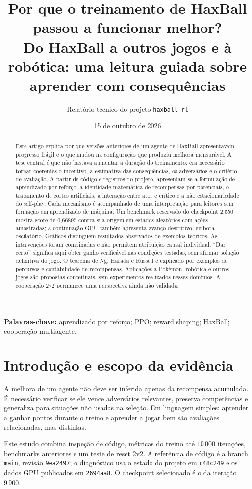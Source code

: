 \documentclass[11pt,a4paper]{article}
\title{\textbf{Por que o treinamento de HaxBall\\passou a funcionar melhor?}\\[5pt]
\large Do HaxBall a outros jogos e à robótica: uma leitura guiada sobre aprender com consequências}
\author{Relatório técnico do projeto \texttt{haxball-rl}}
\date{15 de outubro de 2026}
\newcommand{\code}[1]{\nolinkurl{#1}}
\begin{document}
\maketitle
\begin{abstract}
Este artigo explica por que versões anteriores de um agente de HaxBall apresentavam progresso frágil e o que mudou na configuração que produziu melhora mensurável. A tese central é que não bastava aumentar a duração do treinamento: era necessário tornar coerentes o incentivo, a estimativa das consequências, os adversários e o critério de avaliação. A partir de código e registros do projeto, apresentam-se a formulação de aprendizado por reforço, a identidade matemática de recompensas por potenciais, o tratamento de cortes artificiais, a interação entre ator e crítico e a não estacionariedade do self-play. Cada mecanismo é acompanhado de uma interpretação para leitores sem formação em aprendizado de máquina. Um benchmark reservado do checkpoint 2.550 mostra score de 0,66895 contra sua origem em estados aleatórios com ações amostradas; a continuação GPU também apresenta avanço descritivo, embora oscilatório. Gráficos distinguem resultados observados de exemplos teóricos. As intervenções foram combinadas e não permitem atribuição causal individual. ``Dar certo'' significa aqui obter ganho verificável nas condições testadas, sem afirmar solução definitiva do jogo. O teorema de Ng, Harada e Russell é explicado por exemplos de percursos e contabilidade de recompensas. Aplicações a Pokémon, robótica e outros jogos são propostas conceituais, sem experimentos realizados nesses domínios. A cooperação 2v2 permanece uma perspectiva ainda não validada.
\end{abstract}
\noindent\textbf{Palavras-chave:} aprendizado por reforço; PPO; reward shaping; HaxBall; cooperação multiagente.

\section{Introdução e escopo da evidência}
A melhora de um agente não deve ser inferida apenas da recompensa acumulada. É necessário verificar se ele vence adversários relevantes, preserva competências e generaliza para situações não usadas na seleção. Em linguagem simples: aprender a ganhar pontos durante o treino e aprender a jogar bem são avaliações relacionadas, mas distintas.

Este estudo combina inspeção de código, métricas do treino até $10\,000$ iterações, benchmarks anteriores e um teste de reset 2v2. A referência de código é a branch \code{main}, revisão \code{9ea2497}; o diagnóstico usa o estado do projeto em \code{c48c249} e os dados GPU publicados em \code{2694aa8}. O checkpoint selecionado é o da iteração $9\,900$.
\end{document}
